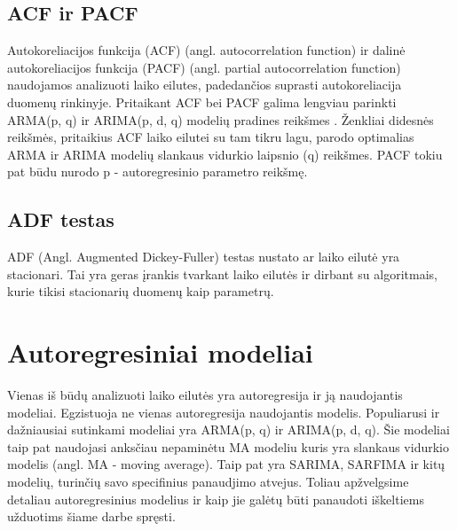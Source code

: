 \documentclass{VUMIFInfKursinis}
\begin{document}
\subsection {ACF ir PACF}
Autokoreliacijos funkcija (ACF) (angl. autocorrelation function) ir dalinė autokoreliacijos funkcija (PACF) (angl. partial autocorrelation function) naudojamos analizuoti laiko eilutes,
padedančios suprasti autokoreliacija duomenų rinkinyje. Pritaikant ACF bei PACF galima lengviau parinkti ARMA(p, q) ir ARIMA(p, d, q) modelių pradines reikšmes \cite{abu2017autoregressive}.
Ženkliai didesnės reikšmės, pritaikius ACF laiko eilutei su tam tikru lagu, parodo optimalias ARMA ir ARIMA modelių slankaus vidurkio laipsnio (q) reikšmes. 
PACF tokiu pat būdu nurodo p - autoregresinio parametro reikšmę. 

\subsection{ADF testas}
ADF (Angl. Augmented Dickey-Fuller) testas nustato ar laiko eilutė yra stacionari. Tai yra geras įrankis tvarkant laiko eilutės ir dirbant su algoritmais, kurie tikisi stacionarių 
duomenų kaip parametrų. 

\section{Autoregresiniai modeliai}
Vienas iš būdų analizuoti laiko eilutės yra autoregresija ir ją naudojantis modeliai. Egzistuoja ne vienas autoregresija naudojantis modelis. 
Populiarusi ir dažniausiai sutinkami modeliai yra ARMA(p, q) ir ARIMA(p, d, q).
Šie modeliai taip pat naudojasi anksčiau nepaminėtu MA modeliu kuris yra slankaus vidurkio modelis (angl. MA - moving average).
Taip pat yra SARIMA, SARFIMA ir kitų modelių, turinčių savo specifinius panaudjimo atvejus. 
Toliau apžvelgsime detaliau autoregresinius modelius ir kaip jie galėtų būti panaudoti iškeltiems užduotims šiame darbe spręsti.
\end{document}
